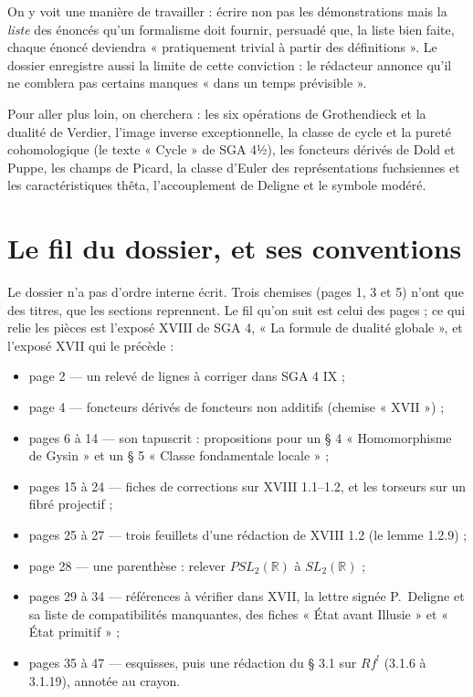 \documentclass[11pt,a4paper]{article}
\begin{document}
\begin{resume}
On y voit une manière de travailler : écrire non pas les démonstrations mais
la \emph{liste} des énoncés qu'un formalisme doit fournir, persuadé que,
la liste bien faite, chaque énoncé deviendra « pratiquement trivial à partir
des définitions ». Le dossier enregistre aussi la limite de cette conviction :
le rédacteur annonce qu'il ne comblera pas certains manques « dans un temps
prévisible ».

Pour aller plus loin, on cherchera : les six opérations de Grothendieck et la
dualité de Verdier, l'image inverse exceptionnelle, la classe de cycle et la
pureté cohomologique (le texte « Cycle » de SGA 4½), les foncteurs dérivés de
Dold et Puppe, les champs de Picard, la classe d'Euler des représentations
fuchsiennes et les caractéristiques thêta, l'accouplement de Deligne et le
symbole modéré.

\end{resume}

\section*{Le fil du dossier, et ses conventions}

Le dossier n'a pas d'ordre interne écrit. Trois chemises (pages 1, 3 et 5)
n'ont que des titres, que les sections reprennent. Le fil qu'on suit est
celui des pages ; ce qui relie les pièces est l'exposé XVIII de SGA 4,
« La formule de dualité globale », et l'exposé XVII qui le précède :

\begin{itemize}
\item page 2 --- un relevé de lignes à corriger dans SGA 4 IX ;
\item page 4 --- foncteurs dérivés de foncteurs non additifs (chemise « XVII ») ;
\item pages 6 à 14 --- son tapuscrit : propositions pour un § 4
« Homomorphisme de Gysin » et un § 5 « Classe fondamentale locale » ;
\item pages 15 à 24 --- fiches de corrections sur XVIII 1.1--1.2, et les
torseurs sur un fibré projectif ;
\item pages 25 à 27 --- trois feuillets d'une rédaction de XVIII 1.2 (le
lemme 1.2.9) ;
\item page 28 --- une parenthèse : relever $PSL_2(\mathbb{R})$ à
$SL_2(\mathbb{R})$ ;
\item pages 29 à 34 --- références à vérifier dans XVII, la lettre signée
P.~Deligne et sa liste de compatibilités manquantes, des fiches « État avant
Illusie » et « État primitif » ;
\item pages 35 à 47 --- esquisses, puis une rédaction du § 3.1 sur $Rf^!$
(3.1.6 à 3.1.19), annotée au crayon.
\end{itemize}
\end{document}
